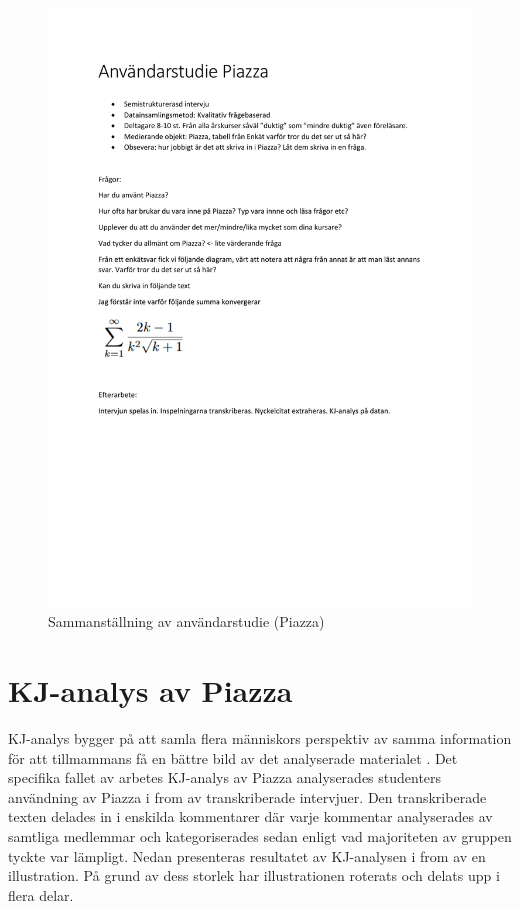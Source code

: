 \begin{figure}[H]
    \centering
    \includegraphics[scale=0.75]{appendix/userstudy_piazza.pdf}
    \caption*{Sammanställning av användarstudie (Piazza)}
    \label{fig:piazzausersurvey}
\end{figure}

\section{KJ-analys av Piazza}
\label{app:KJ-analys}
KJ-analys bygger på att samla flera människors perspektiv av samma information för att tillmammans få en bättre bild av det analyserade materialet \cite{kj}. Det specifika fallet av arbetes KJ-analys av Piazza analyserades studenters användning av Piazza i from av transkriberade intervjuer. Den transkriberade texten delades in i enskilda kommentarer där varje kommentar analyserades av samtliga medlemmar och kategoriserades sedan enligt vad majoriteten av gruppen tyckte var lämpligt. Nedan presenteras resultatet av KJ-analysen i from av en illustration. På grund av dess storlek har illustrationen roterats och delats upp i flera delar.

